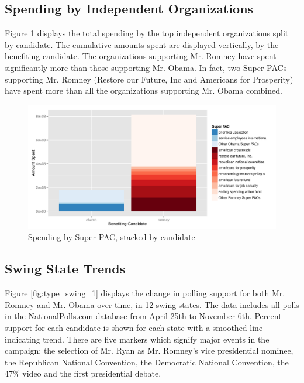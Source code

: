 \documentclass[11pt]{article}\usepackage{graphicx, color}
\newenvironment{knitrout}{}{} %
\begin{document}
\subsection{Spending by Independent Organizations}
Figure \ref{fig:PAC_plot} displays the total spending by the top independent organizations split by candidate. The cumulative amounts spent are displayed vertically, by the benefiting candidate. The organizations supporting Mr. Romney have spent significantly more than those supporting Mr. Obama. In fact, two Super PACs supporting Mr. Romney (Restore our Future, Inc and Americans for Prosperity) have spent more than all the organizations supporting Mr. Obama combined.

\begin{knitrout}
\color{fgcolor}\begin{figure}[H]


{\centering \includegraphics[width=\textwidth]{figure/PAC_plot} 

}

\caption[Spending by Super PAC, stacked by candidate]{Spending by Super PAC, stacked by candidate\label{fig:PAC_plot}}
\end{figure}

\end{knitrout}




\subsection{Swing State Trends}

Figure \ref{fig:type_swing_1} displays the change in polling support for both Mr. Romney and Mr. Obama over time, in 12 swing states. The data includes all polls in the NationalPolls.com database from April 25th to November 6th. Percent support for each candidate is shown for each state with a smoothed line indicating trend. There are five markers which signify major events in the campaign: the selection of Mr. Ryan as Mr. Romney's vice presidential nominee, the Republican National Convention, the Democratic National Convention, the 47\% video and the first presidential debate. 
\end{document}
